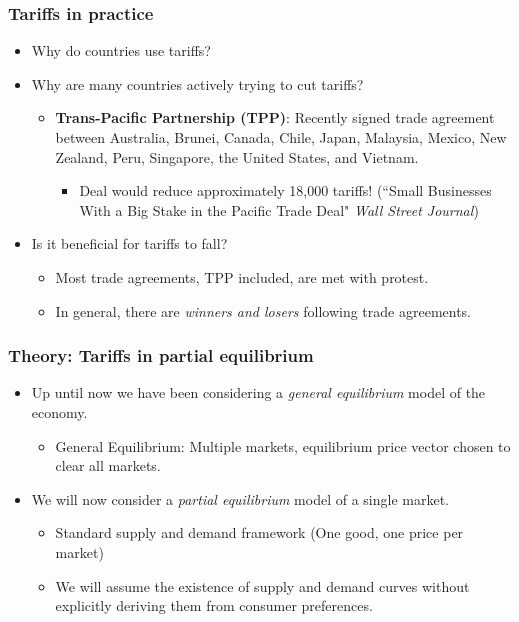 \documentclass{beamer}
\begin{document}
\begin{frame}
	\frametitle{Tariffs in practice}
	
\begin{itemize}
		\item Why do countries use tariffs?
		\item Why are many countries actively trying to cut tariffs?
			\begin{itemize}
				\item  \textbf{Trans-Pacific Partnership (TPP)}: Recently signed trade agreement between Australia, Brunei, Canada, Chile, Japan, Malaysia, Mexico, New Zealand, Peru, Singapore, the United States, and Vietnam.
					\begin{itemize}
						\item Deal would reduce approximately 18,000 tariffs! (``Small Businesses With a Big Stake in the Pacific Trade Deal" \emph{Wall Street Journal})
					\end{itemize}
			\end{itemize}
		\item Is it beneficial for tariffs to fall?
			\begin{itemize}
				\item Most trade agreements, TPP included, are met with protest.
				\item In general, there are \emph{winners and losers} following trade agreements.
			\end{itemize}
		
	\end{itemize}
\end{frame}


\begin{frame}
	\frametitle{Theory: Tariffs in partial equilibrium}
	\begin{itemize}
		\item Up until now we have been considering a \emph{general equilibrium} model of the economy.
			\begin{itemize}
				\item General Equilibrium: Multiple markets, equilibrium price vector chosen to clear all markets.
			\end{itemize}
		\item We will now consider a \emph{partial equilibrium} model of a single market.
			\begin{itemize}
				\item Standard supply and demand framework (One good, one price per market)
				\item We will assume the existence of supply and demand curves without explicitly deriving them from consumer preferences.
			\end{itemize}
		
	\end{itemize}
\end{frame}
\end{document}
